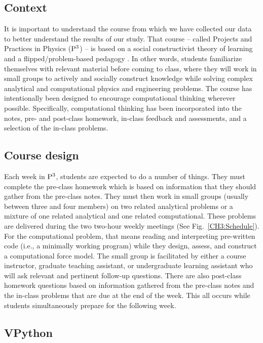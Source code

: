 \documentclass{msuphddissertation}
\begin{document}
\begin{doublespace}
%
%
%
%
%
%
%
%
%
%
%
%
%
%
%
%

\chapter{Context}\label{CH3:Context}

It is important to understand the course from which we have collected our data to better understand the results of our study.  That course -- called Projects and Practices in Physics (${\rm P}^{3}$) -- is based on a social constructivist theory of learning and a flipped/problem-based pedagogy \cite{Irving2017}.  In other words, students familiarize themselves with relevant material before coming to class, where they will work in small groups to actively and socially construct knowledge while solving complex analytical and computational physics and engineering problems.  The course has intentionally been designed to encourage computational thinking wherever possible.  Specifically, computational thinking has been incorporated into the notes, pre- and post-class homework, in-class feedback and assessments, and a selection of the in-class problems.

\section{Course design}

Each week in ${\rm P}^{3}$, students are expected to do a number of things. They must complete the pre-class homework which is based on information that they should gather from the pre-class notes.  They must then work in small groups (usually between three and four members) on two related analytical problems or a mixture of one related analytical and one related computational.  These problems are delivered during the two two-hour weekly meetings (See Fig.~\ref{CH3:Schedule}).  For the computational problem, that means reading and interpreting pre-written code (i.e., a minimally working program) while they design, assess, and construct a computational force model.  The small group is facilitated by either a course instructor, graduate teaching assistant, or undergraduate learning assistant who will ask relevant and pertinent follow-up questions.  There are also post-class homework questions based on information gathered from the pre-class notes and the in-class problems that are due at the end of the week.  This all occurs while students simultaneously prepare for the following week.

\section{VPython}


\end{doublespace}
\end{document}
